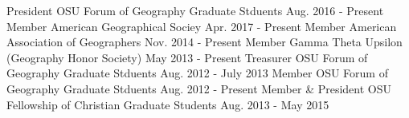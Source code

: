 \begin{cvmemberships}
  \cvmembership
    {\hspace{-3 em} President}
    {OSU Forum of Geography Graduate Stduents}
    {\hspace{-2 em} Aug. 2016 - Present}
    {} %
  \cvmembership
    {\hspace{-3 em} Member}
    {American Geographical Sociey}
    {\hspace{-2 em} Apr. 2017 - Present}
    {} %
  \cvmembership
    {\hspace{-3 em} Member}
    {American Association of Geographers}
    {Nov. 2014 - Present}
    {} %
  \cvmembership
    {\hspace{-3 em} Member}
    {Gamma Theta Upsilon (Geography Honor Society)}
    {May 2013 - Present}
    {} %
  \cvmembership
    {\hspace{-3 em} Treasurer}
    {OSU Forum of Geography Graduate Stduents}
    {\hspace{-2 em} Aug. 2012 - July 2013}
    {} %
  \cvmembership
    {\hspace{-3 em} Member}
    {OSU Forum of Geography Graduate Stduents}
    {Aug. 2012 - Present}
    {} %
  \cvmembership
    {\hspace{-3 em} Member \& President}
    {OSU Fellowship of Christian Graduate Students}
    {\hspace{-2 em} Aug. 2013 - May 2015}
    {} %
\end{cvmemberships}
